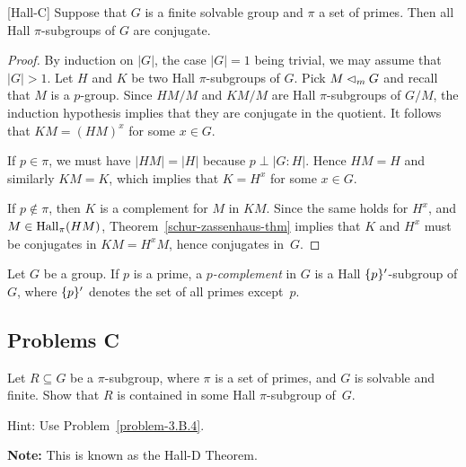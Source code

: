 \begin{thm}\label{hall-c}{\rm[Hall-C]}
    Suppose that\/ $G$ is a finite solvable group and $\pi$ a set of primes. Then all Hall\/ $\pi$-subgroups of\/ $G$ are conjugate.
\end{thm}

\begin{proof} By induction on $|G|$, the case $|G|=1$ being trivial, we may assume that $|G|>1$. Let $H$ and $K$ be two Hall $\pi$-subgroups of $G$. Pick $M\lhd_mG$ and recall that $M$ is a $p$-group. Since $HM/M$ and $KM/M$ are Hall $\pi$-subgroups of $G/M$, the induction hypothesis implies that they are conjugate in the quotient. It follows that $KM=(HM)^x$ for some $x\in G$.

If $p\in\pi$, we must have $|HM|=|H|$ because $p\perp|G:H|$. Hence $HM=H$ and similarly $KM=K$, which implies that $K=H^x$ for some $x\in G$.

If $p\notin\pi$, then $K$ is a complement for $M$ in $KM$. Since the same holds for $H^x$, and $M\in{\rm Hall}_{\pi}(HM)$, Theorem~\ref{schur-zassenhaus-thm} implies that $K$ and $H^x$ must be conjugates in $KM=H^xM$, hence conjugates in~$G$.  \end{proof}

\begin{defn}
    Let\/ $G$ be a group. If\/ $p$ is a prime, a \textsl{$p$-complement} in\/ $G$ is a Hall\/ $\{p\}'$-subgroup of\/ $G$, where\/ $\{p\}'$ denotes the set of all primes except\/~$p$. 
\end{defn}

\subsection{Problems C}

\begin{probl}\label{problem-3.C.1}
    Let\/ $R\subseteq G$ be a\/ $\pi$-subgroup, where\/ $\pi$ is a set of primes, and\/ $G$ is solvable and finite. Show that\/ $R$ is contained in some Hall\/ $\pi$-subgroup of\/~$G$.

    \textrm{\rm Hint: Use Problem~\ref{problem-3.B.4}}.
    
    \textrm{\rm\textbf{Note:} This is known as the Hall-D Theorem}.
\end{probl}

